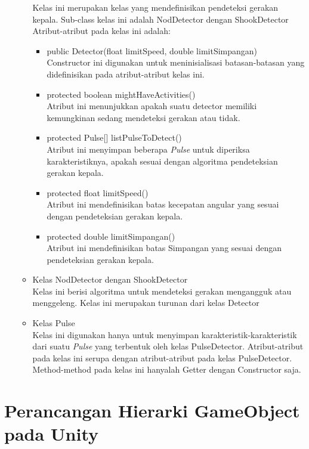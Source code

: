 \begin{itemize}
\begin{itemize}
        Kelas ini merupakan kelas yang mendefinisikan pendeteksi gerakan kepala. Sub-class kelas ini adalah NodDetector dengan ShookDetector
        Atribut-atribut pada kelas ini adalah:
        \begin{itemize}
            \item public Detector(float limitSpeed, double limitSimpangan)\\
            Constructor ini digunakan untuk meninisialisasi batasan-batasan yang didefinisikan pada atribut-atribut kelas ini.
            \item protected boolean mightHaveActivities()\\
            Atribut ini menunjukkan apakah suatu detector memiliki kemungkinan sedang mendeteksi gerakan atau tidak.
            \item protected Pulse[] listPulseToDetect()\\
            Atribut ini menyimpan beberapa \textit{Pulse} untuk diperiksa karakteristiknya, apakah sesuai dengan algoritma pendeteksian gerakan kepala.
            \item protected float limitSpeed()\\
            Atribut ini mendefinisikan batas kecepatan angular yang sesuai dengan pendeteksian gerakan kepala.
            \item protected double limitSimpangan()\\
            Atribut ini mendefinisikan batas Simpangan yang sesuai dengan pendeteksian gerakan kepala.
        \end{itemize}
        \item Kelas NodDetector dengan ShookDetector\\
        Kelas ini berisi algoritma untuk mendeteksi gerakan mengangguk atau menggeleng. Kelas ini merupakan turunan dari kelas Detector
        \item Kelas Pulse\\
        Kelas ini digunakan hanya untuk menyimpan karakteristik-karakteristik dari suatu \textit{Pulse} yang terbentuk oleh kelas PulseDetector. Atribut-atribut pada kelas ini serupa dengan atribut-atribut pada kelas PulseDetector. Method-method pada kelas ini hanyalah Getter dengan Constructor saja.  
    \end{itemize}
\end{itemize}


\section{Perancangan Hierarki GameObject pada Unity}
\label{sec:perancangan_hierarki_gameobject_pada_unity}

